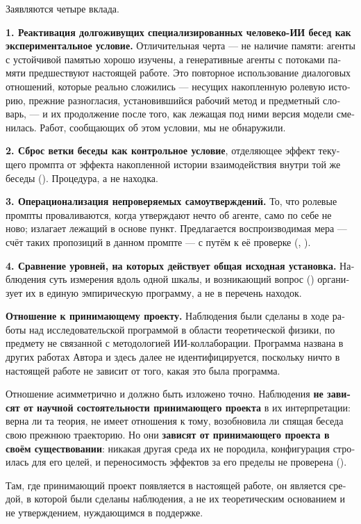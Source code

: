 \begin{russian}
Заявляются четыре вклада.

\textbf{1. Реактивация долгоживущих специализированных человеко-ИИ бесед как экспериментальное условие.} Отличительная черта — не наличие памяти: агенты с устойчивой памятью хорошо изучены, а генеративные агенты с потоками памяти предшествуют настоящей работе. Это повторное использование диалоговых отношений, которые реально сложились — несущих накопленную ролевую историю, прежние разногласия, установившийся рабочий метод и предметный словарь, — и их продолжение после того, как лежащая под ними версия модели сменилась. Работ, сообщающих об этом условии, мы не обнаружили.

\textbf{2. Сброс ветки беседы как контрольное условие}, отделяющее эффект текущего промпта от эффекта накопленной истории взаимодействия внутри той же беседы (). Процедура, а не находка.

\textbf{3. Операционализация непроверяемых самоутверждений.} То, что ролевые промпты проваливаются, когда утверждают нечто об агенте, само по себе не ново;  излагает лежащий в основе пункт. Предлагается воспроизводимая мера — счёт таких пропозиций в данном промпте — с путём к её проверке (, ).

\textbf{4. Сравнение уровней, на которых действует общая исходная установка.} Наблюдения суть измерения вдоль одной шкалы, и возникающий вопрос () организует их в единую эмпирическую программу, а не в перечень находок.

\textbf{Отношение к принимающему проекту.} Наблюдения были сделаны в ходе работы над исследовательской программой в области теоретической физики, по предмету не связанной с методологией ИИ-коллаборации. Программа названа в других работах Автора и здесь далее не идентифицируется, поскольку ничто в настоящей работе не зависит от того, какая это была программа.

Отношение асимметрично и должно быть изложено точно. Наблюдения \textbf{не зависят от научной состоятельности принимающего проекта} в их интерпретации: верна ли та теория, не имеет отношения к тому, возобновила ли спящая беседа свою прежнюю траекторию. Но они \textbf{зависят от принимающего проекта в своём существовании}: никакая другая среда их не породила, конфигурация строилась для его целей, и переносимость эффектов за его пределы не проверена ().

Там, где принимающий проект появляется в настоящей работе, он является средой, в которой были сделаны наблюдения, а не их теоретическим основанием и не утверждением, нуждающимся в поддержке.



\end{russian}
